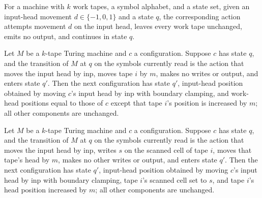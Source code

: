 \begin{definition}
\label{Turing.inputMoveAction}
\leanok
{}
For a machine with $k$ work tapes, a symbol alphabet, and a state set, given an
input-head movement $d\in\{-1,0,1\}$ and a state $q$, the corresponding action attempts
movement $d$ on the input head, leaves every work tape unchanged, emits no output, and
continues in state $q$.
\end{definition}

\begin{theorem}
\label{Turing.step_of_tapeAction_move}
\leanok
{}
Let $M$ be a $k$-tape Turing machine and $c$ a configuration. Suppose $c$ has state $q$,
and the transition of $M$ at $q$ on the symbols currently read is the action that moves
the input head by $\mathrm{inp}$, moves tape $i$ by $m$, makes no writes or output, and
enters state $q'$. Then the next configuration has state $q'$, input-head position
obtained by moving $c$'s input head by $\mathrm{inp}$ with boundary clamping, and
work-head positions equal to those of $c$ except that tape $i$'s position is increased
by $m$; all other components are unchanged.
\end{theorem}

\begin{theorem}
\label{Turing.step_of_tapeAction_write}
\leanok
{}
Let $M$ be a $k$-tape Turing machine and $c$ a configuration. Suppose $c$ has state $q$,
and the transition of $M$ at $q$ on the symbols currently read is the action that moves
the input head by $\mathrm{inp}$, writes $s$ on the scanned cell of tape $i$, moves that
tape's head by $m$, makes no other writes or output, and enters state $q'$. Then the
next configuration has state $q'$, input-head position obtained by moving $c$'s input
head by $\mathrm{inp}$ with boundary clamping, tape $i$'s scanned cell set to $s$, and
tape $i$'s head position increased by $m$; all other components are unchanged.
\end{theorem}

